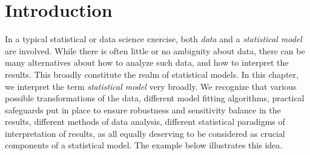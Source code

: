 \section{Introduction}

%
%
%
%
%
%
%



In a typical statistical or data science  exercise, both \textit{data} and a \textit{statistical model} are involved. While there is often little or no ambiguity about data, there can be many alternatives about how to analyze such data, and how to interpret the results. This broadly constitute the realm of statistical 
models. In this chapter, we interpret the term \textit{statistical model} very broadly. We recognize that various possible transformations of the data, different model fitting algorithms, practical safeguards put in place to ensure robustness and sensitivity balance in the results, different methods of data analysis, different statistical paradigms of interpretation of results, as all equally deserving to be considered as crucial components of a statistical model.
The example below illustrates this idea. 

